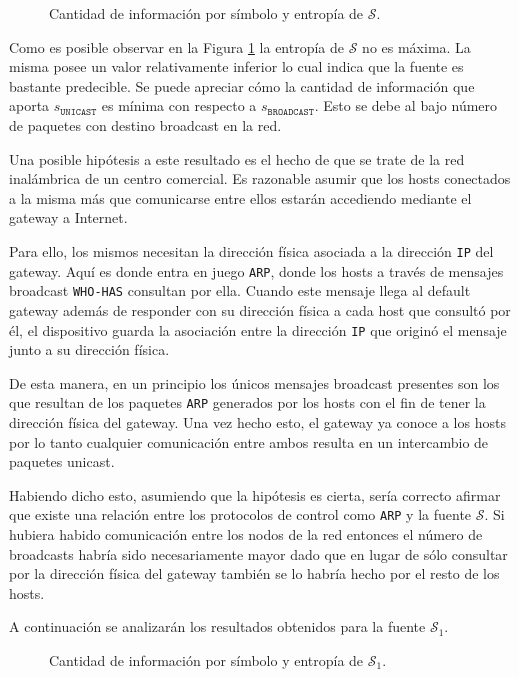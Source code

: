 \begin{figure}[h]
	\caption{Cantidad de información por símbolo y entropía de $\mathcal{S}$.}
    \label{res:esc2:fig1}
\end{figure}


Como es posible observar en la Figura \ref{res:esc2:fig1} la entropía de
$\mathcal{S}$ no es máxima. La misma posee un valor relativamente inferior lo
cual indica que la fuente es bastante predecible. Se puede apreciar cómo la
cantidad de información que aporta $s_{\texttt{UNICAST}}$ es mínima con respecto
a $s_{\texttt{BROADCAST}}$. Esto se debe al bajo número de paquetes con destino
broadcast en la red.

Una posible hipótesis a este resultado es el hecho de que se trate de la red
inalámbrica de un centro comercial. Es razonable asumir que los hosts conectados
a la misma más que comunicarse entre ellos estarán accediendo mediante el
gateway a Internet.

Para ello, los mismos necesitan la dirección física asociada a la dirección
\texttt{IP} del gateway. Aquí es donde entra en juego \texttt{ARP}, donde los
hosts a través de mensajes broadcast \texttt{WHO-HAS} consultan por ella. Cuando
este mensaje llega al default gateway además de responder con su dirección
física a cada host que consultó por él, el dispositivo guarda la asociación
entre la dirección \texttt{IP} que originó el mensaje junto a su dirección física.

De esta manera, en un principio los únicos mensajes broadcast presentes son los
que resultan de los paquetes \texttt{ARP} generados por los hosts con el fin de
tener la dirección física del gateway. Una vez hecho esto, el gateway ya conoce
a los hosts por lo tanto cualquier comunicación entre ambos resulta en un
intercambio de paquetes unicast.

Habiendo dicho esto, asumiendo que la hipótesis es cierta, sería correcto
afirmar que existe una relación entre los protocolos de control como
\texttt{ARP} y la fuente $\mathcal{S}$. Si hubiera habido comunicación entre los
nodos de la red entonces el número de broadcasts habría sido necesariamente
mayor dado que en lugar de sólo consultar por la dirección física del gateway
también se lo habría hecho por el resto de los hosts.

A continuación se analizarán los resultados obtenidos para la fuente
$\mathcal{S}_1$.

\begin{figure}[h]
	\caption{Cantidad de información por símbolo y entropía de $\mathcal{S}_1$.}
    \label{res:esc2:fig2}
\end{figure}

